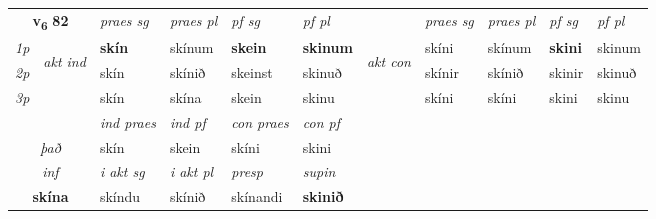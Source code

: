 \noindent
\begin{tabular}{lllllllllll} \toprule
\multicolumn{2}{c}{\textbf{v{\textsubscript{6}}} \Large{\textbf{82}}}  &  \textit{praes sg}  & \textit{praes pl}  &\textit{ pf sg} & \textit{pf pl} &  &  \textit{praes sg}  & \textit{praes pl}  & \textit{pf sg} & \textit{pf pl } \\*
	\cmidrule{3-6} \cmidrule{8-11}
 {\textit{1p}} & \multirow{3}{*}{\begin{turn}{90}\textit{akt ind}\end{turn}} & \textbf{skín} & skínum & \textbf{skein} & \textbf{skinum} & \multirow{3}{*}{\begin{turn}{90}\textit{akt con}\end{turn}} &skíni & skínum & \textbf{skini} & skinum\\*
 {\textit{2p}} &  &  skín  & skínið & skeinst & skinuð & & skínir & skínið & skinir & skinuð \\*
{\textit{3p}} &  & skín & skína & skein & skinu & & skíni & skíni& skini & skinu \\*
\cmidrule{3-6} \cmidrule{8-11}

   & &  \textit{ind praes} & \textit{ind pf} & \textit{con praes} & \textit{con pf} \\*
\multicolumn{2}{c}{ \textit{það} } & skín & skein & skíni & skini \\*

\cmidrule{3-6}
   \multicolumn{2}{c}{\textit{inf}}  & \textit{i akt sg} & \textit{i akt pl}   & \textit{presp} & \textit{supin}   \\*
  \multicolumn{2}{c}{\textbf{skína}} & skíndu  & skínið   & skínandi &  \textbf{skinið}   \\*
\end{tabular}

